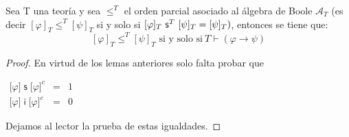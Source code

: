   \begin{lemma}
    \PN Sea T una teoría y sea $\leq^{T}$ el orden parcial asociado al álgebra de Boole $\mathcal{A}_{T}$ (es decir
    $[\varphi]_{T} \leq^{T} [\psi]_{T}$ si y solo si $[\varphi]_{T} \ \SU^{T} \ [\psi]_{T} = [\psi]_{T})$, entonces se
    tiene que:
    \[
      [\varphi]_{T} \leq^{T} [\psi]_{T} \text{ si y solo si} \ T \vdash (\varphi \rightarrow \psi)
    \]
  \end{lemma}
  \begin{proof}
    En virtud de los lemas anteriores solo falta probar que

    $\displaystyle \begin{array}{rcl} \lbrack \varphi \rbrack\;\mathsf{s}\;\lbrack\varphi \rbrack^{c} & =& 1 \\ \lbrack \varphi \rbrack\;\mathsf{i}\;\lbrack\varphi \rbrack^{c} & =& 0 \end{array} $

    Dejamos al lector la prueba de estas igualdades.
  \end{proof}

